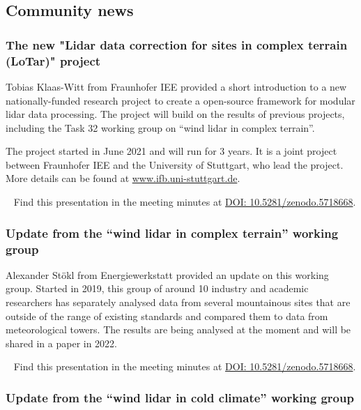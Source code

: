 \subsection{Community news}

\subsubsection{The new "Lidar data correction for sites in complex terrain (LoTar)" project}

Tobias Klaas-Witt from Fraunhofer IEE provided a short introduction to a new nationally-funded research project to create a open-source framework for modular lidar data processing. The project will build on the results of previous projects, including the Task 32 working group on ``wind lidar in complex terrain''. 

The project started in June 2021 and will run for 3 years. It is a joint project between Fraunhofer IEE and the  University of Stuttgart, who lead the project. More details can be found at \href{https://www.ifb.uni-stuttgart.de/forschung/windenergie/forschungsprojekte/LoTar/}{www.ifb.uni-stuttgart.de}.

\faFilePowerpointO ~ Find this presentation in the meeting minutes at \href{https://doi.org/10.5281/zenodo.5718668}{DOI: 10.5281/zenodo.5718668}.

\subsubsection{Update from the “wind lidar in complex terrain” working group} 

Alexander Stökl from Energiewerkstatt provided an update on this working group. Started in 2019, this group of around 10 industry and academic researchers has separately analysed data from several mountainous sites that are outside of the range of existing standards and compared them to data from meteorological towers. The results are being analysed at the moment and will be shared in a paper in 2022.

\faFilePowerpointO ~ Find this presentation in the meeting minutes at \href{https://doi.org/10.5281/zenodo.5718668}{DOI: 10.5281/zenodo.5718668}.

\subsubsection{Update from the “wind lidar in cold climate” working group} 

